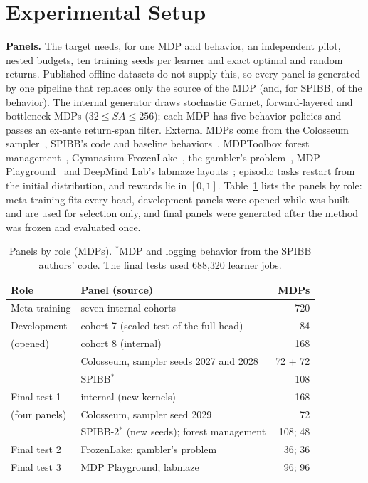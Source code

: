 \section{Experimental Setup}
\label{sec:setup}

\textbf{Panels.} The target needs, for one MDP and behavior, an independent pilot, nested budgets, ten training seeds per learner and exact optimal and random returns. Published offline datasets do not supply this, so every panel is generated by one pipeline that replaces only the source of the MDP (and, for SPIBB, of the behavior). The internal generator draws stochastic Garnet, forward-layered and bottleneck MDPs ($32\le SA\le256$); each MDP has five behavior policies and passes an ex-ante return-span filter. External MDPs come from the Colosseum sampler~\cite{conserva2022hardness}, SPIBB's code and baseline behaviors~\cite{laroche2019spibb}, MDPToolbox forest management~\cite{chades2014mdptoolbox}, Gymnasium FrozenLake~\cite{towers2024gymnasium}, the gambler's problem~\cite{sutton2018reinforcement}, MDP Playground~\cite{rajan2023mdp} and DeepMind Lab's labmaze layouts~\cite{beattie2016deepmind}; episodic tasks restart from the initial distribution, and rewards lie in $[0,1]$. Table~\ref{tab:setup} lists the panels by role: meta-training fits every head, development panels were opened while \OEH{} was built and are used for selection only, and final panels were generated after the method was frozen and evaluated once.

\begin{table}[t]
\centering
\caption{Panels by role (MDPs). $^{*}$MDP and logging behavior from the SPIBB authors' code. The final tests used 688{,}320 learner jobs.}
\label{tab:setup}
\footnotesize
\setlength{\tabcolsep}{2.5pt}
\begin{tabular}{@{}llr@{}}
\toprule
Role & Panel (source) & MDPs\\
\midrule
Meta-training & seven internal cohorts & 720\\
\midrule
Development & cohort 7 (sealed test of the full head) & 84\\
(opened) & cohort 8 (internal) & 168\\
 & Colosseum, sampler seeds 2027 and 2028 & 72 + 72\\
 & SPIBB$^{*}$ & 108\\
\midrule
Final test 1 & internal (new kernels) & 168\\
(four panels) & Colosseum, sampler seed 2029 & 72\\
 & SPIBB-2$^{*}$ (new seeds); forest management & 108; 48\\
Final test 2 & FrozenLake; gambler's problem & 36; 36\\
Final test 3 & MDP Playground; labmaze & 96; 96\\
\bottomrule
\end{tabular}
\end{table}

